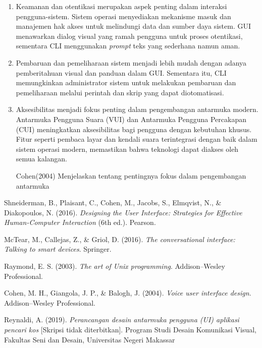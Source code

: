 \documentclass[12pt]{article}
\begin{document}
\begin{enumerate}
\item {Keamanan dan otentikasi} merupakan aspek penting dalam interaksi pengguna-sistem. Sistem operasi menyediakan mekanisme masuk dan manajemen hak akses untuk melindungi data dan sumber daya sistem. GUI menawarkan dialog visual yang ramah pengguna untuk proses otentikasi, sementara CLI menggunakan \textit{prompt} teks yang sederhana namun aman.

\item {Pembaruan dan pemeliharaan sistem} menjadi lebih mudah dengan adanya pemberitahuan visual dan panduan dalam GUI. Sementara itu, CLI memungkinkan administrator sistem untuk melakukan pembaruan dan pemeliharaan melalui perintah dan skrip yang dapat diotomatisasi.

\item{Aksesibilitas} menjadi fokus penting dalam pengembangan antarmuka modern. Antarmuka Pengguna Suara (VUI) dan Antarmuka Pengguna Percakapan (CUI) meningkatkan aksesibilitas bagi pengguna dengan kebutuhan khusus. Fitur seperti pembaca layar dan kendali suara terintegrasi dengan baik dalam sistem operasi modern, memastikan bahwa teknologi dapat diakses oleh semua kalangan.

Cohen(2004) Menjelaskan tentang pentingnya fokus dalam pengembangan antarmuka 
\end{enumerate}

\begin{thebibliography}{9} 

Shneiderman, B., Plaisant, C., Cohen, M., Jacobs, S., Elmqvist, N., \& Diakopoulos, N. (2016). \textit{Designing the User Interface: Strategies for Effective Human-Computer Interaction} (6th ed.). Pearson.

McTear, M., Callejas, Z., \& Griol, D. (2016). \textit{The conversational interface: Talking to smart devices}. Springer.

Raymond, E. S. (2003). \textit{The art of Unix programming}. Addison--Wesley Professional. 

Cohen, M. H., Giangola, J. P., \& Balogh, J. (2004). \textit{Voice user interface design}. Addison--Wesley Professional.

Reynaldi, A. (2019). \textit{Perancangan desain antarmuka pengguna (UI) aplikasi pencari kos} [Skripsi tidak diterbitkan]. Program Studi Desain Komunikasi Visual, Fakultas Seni dan Desain, Universitas Negeri Makassar


			

\end{thebibliography}
\end{document}
